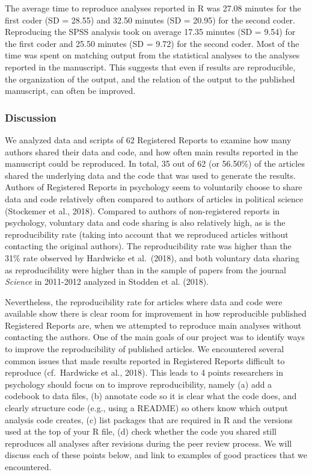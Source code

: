 \documentclass[,jou, a4paper,floatsintext]{apa6}
\begin{document}
The average time to reproduce analyses reported in R was 27.08 minutes for the first coder (SD = 28.55) and 32.50 minutes (SD = 20.95) for the second coder. Reproducing the SPSS analysis took on average 17.35 minutes (SD = 9.54) for the first coder and 25.50 minutes (SD = 9.72) for the second coder. Most of the time was spent on matching output from the statistical analyses to the analyses reported in the manuscript. This suggests that even if results are reproducible, the organization of the output, and the relation of the output to the published manuscript, can often be improved.

\hypertarget{discussion}{%
\subsubsection{Discussion}\label{discussion}}

We analyzed data and scripts of 62 Registered Reports to examine how many authors shared their data and code, and how often main results reported in the manuscript could be reproduced. In total, 35 out of 62 (or 56.50\%) of the articles shared the underlying data and the code that was used to generate the results. Authors of Registered Reports in psychology seem to voluntarily choose to share data and code relatively often compared to authors of articles in political science (Stockemer et al., 2018). Compared to authors of non-registered reports in psychology, voluntary data and code sharing is also relatively high, as is the reproducibility rate (taking into account that we reproduced articles without contacting the original authors). The reproducibility rate was higher than the 31\% rate observed by Hardwicke et al.~(2018), and both voluntary data sharing as reproducibility were higher than in the sample of papers from the journal \emph{Science} in 2011-2012 analyzed in Stodden et al. (2018).

Nevertheless, the reproducibility rate for articles where data and code were available show there is clear room for improvement in how reproducible published Registered Reports are, when we attempted to reproduce main analyses without contacting the authors. One of the main goals of our project was to identify ways to improve the reproducibility of published articles. We encountered several common issues that made results reported in Registered Reports difficult to reproduce (cf.~Hardwicke et al., 2018). This leads to 4 points researchers in psychology should focus on to improve reproducibility, namely (a) add a codebook to data files, (b) annotate code so it is clear what the code does, and clearly structure code (e.g., using a README) so others know which output analysis code creates, (c) list packages that are required in R and the versions used at the top of your R file, (d) check whether the code you shared still reproduces all analyses after revisions during the peer review process. We will discuss each of these points below, and link to examples of good practices that we encountered.
\end{document}
